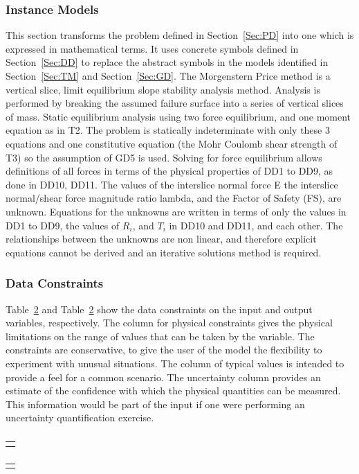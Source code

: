 \documentclass[12pt]{article}
\begin{document}
\subsubsection{Instance Models}
\label{Sec:IM}
This section transforms the problem defined in Section~\ref{Sec:PD} into one which is expressed in mathematical terms. It uses concrete symbols defined in Section~\ref{Sec:DD} to replace the abstract symbols in the models identified in Section~\ref{Sec:TM} and Section~\ref{Sec:GD}.
The Morgenstern Price method is a vertical slice, limit equilibrium slope stability analysis method. Analysis is performed by breaking the assumed failure surface into a series of vertical slices of mass. Static equilibrium analysis using two force equilibrium, and one moment equation as in T2. The problem is statically indeterminate with only these 3 equations and one constitutive equation (the Mohr Coulomb shear strength of T3) so the assumption of GD5 is used. Solving for force equilibrium allows definitions of all forces in terms of the physical properties of DD1 to DD9, as done in DD10, DD11.
The values of the interslice normal force E the interslice normal/shear force magnitude ratio lambda, and the Factor of Safety (FS), are unknown. Equations for the unknowns are written in terms of only the values in DD1 to DD9, the values of $R_{i}$, and $T_{i}$ in DD10 and DD11, and each other. The relationships between the unknowns are non linear, and therefore explicit equations cannot be derived and an iterative solutions method is required.
\subsubsection{Data Constraints}
\label{Sec:DC}
Table~\ref{Table:} and Table~\ref{Table:} show the data constraints on the input and output variables, respectively. The column for physical constraints gives the physical limitations on the range of values that can be taken by the variable. The constraints are conservative, to give the user of the model the flexibility to experiment with unusual situations. The column of typical values is intended to provide a feel for a common scenario. The uncertainty column provides an estimate of the confidence with which the physical quantities can be measured. This information would be part of the input if one were performing an uncertainty quantification exercise.
\begin{longtable}{l}
\toprule
\\
\midrule
\bottomrule
\caption{}
\label{Table:}
\end{longtable}
\begin{longtable}{l}
\toprule
\\
\midrule
\bottomrule
\caption{}
\label{Table:}
\end{longtable}
\end{document}
